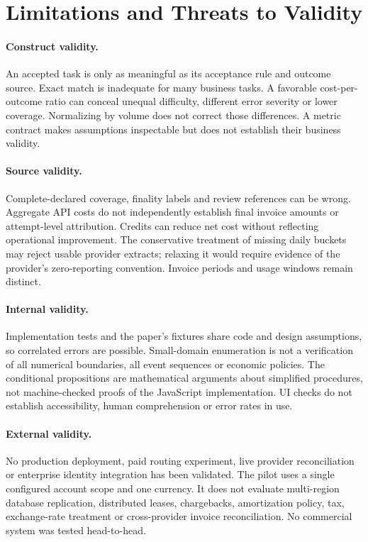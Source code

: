 \documentclass[10pt,twocolumn]{article}
\begin{document}
\section{Limitations and Threats to Validity}
\label{sec:limits}

\paragraph{Construct validity.}
An accepted task is only as meaningful as its acceptance rule and outcome source. Exact match is inadequate for many business tasks. A favorable cost-per-outcome ratio can conceal unequal difficulty, different error severity or lower coverage. Normalizing by volume does not correct those differences. A metric contract makes assumptions inspectable but does not establish their business validity.

\paragraph{Source validity.}
Complete-declared coverage, finality labels and review references can be wrong. Aggregate API costs do not independently establish final invoice amounts or attempt-level attribution. Credits can reduce net cost without reflecting operational improvement. The conservative treatment of missing daily buckets may reject usable provider extracts; relaxing it would require evidence of the provider's zero-reporting convention. Invoice periods and usage windows remain distinct.

\paragraph{Internal validity.}
Implementation tests and the paper's fixtures share code and design assumptions, so correlated errors are possible. Small-domain enumeration is not a verification of all numerical boundaries, all event sequences or economic policies. The conditional propositions are mathematical arguments about simplified procedures, not machine-checked proofs of the JavaScript implementation. UI checks do not establish accessibility, human comprehension or error rates in use.

\paragraph{External validity.}
No production deployment, paid routing experiment, live provider reconciliation or enterprise identity integration has been validated. The pilot uses a single configured account scope and one currency. It does not evaluate multi-region database replication, distributed leases, chargebacks, amortization policy, tax, exchange-rate treatment or cross-provider invoice reconciliation. No commercial system was tested head-to-head.
\end{document}
